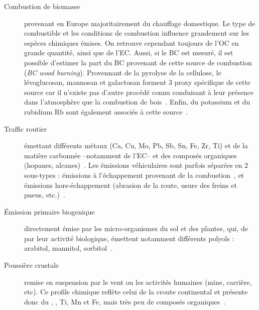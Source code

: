 \begin{description}
    \item[Combustion de biomasse] provenant en Europe majoritairement du chauffage
        domestique. Le type de combustible et les conditions de combustion influence
        grandement sur les espèces chimiques émises. On retrouve cependant toujours de
        l'OC en grande quantité, ainsi que de l'EC. Aussi, si le BC est mesuré, il est
        possible d'estimer la part du BC provenant de cette source de combustion \BCwb{}
        (\textit{BC wood burning}).
        Provennant de la pyrolyse de la cellulose, le lévoglucosan, mannosan et
        galactosan forment 3 proxy spécifique de cette source car il n'existe pas d'autre
        procédé connu conduisant à leur présence dans l'atmosphère que la combustion de
        bois~\autocite{jordanLevoglucosan2006,puxbaumLevoglucosan2007}.
        Enfin, du potassium  et du rubidium Rb sont également associés à cette
        source~\autocite{navaBiomass2015,gollyEtude2014,chevrierChauffage2016}.

    \item[Traffic routier] émettant différents métaux (Ca, Cu, Mo, Pb, Sb, Sn, Fe, Zr,
        Ti) et de la matière carbonnée --notamment de l'EC-- et des composés organiques
        (hopanes, alcanes)~\autocite{charronIdentification2019}. Les émissions
        véhiculaires sont parfois séparées en 2 sous-types : émissions à l'échappement
        provenant de la combustion~\autocite{allenSize2001,huMetals2009,vianaSource2008},
        et émissions hors-échappement (abrasion de la route, usure des freins et pneus,
        etc.)~\autocite{sandersAirborne2003,sternbeckMetal2002}.

    \item[Émission primaire biogenique] directement émise par les micro-organismes du sol
        et des plantes, qui, de par leur activité biologique, émettent notamment
        différents polyols : arabitol, mannitol,
        sorbitol~\autocite{bauerSignificant2008,yttriAmbient2007,samakePolyols2019}.

    \item[Poussière crustale] remise en suspension par le vent ou les activités humaines
        (mine, carrière, etc). Ce profile chimique reflète celui de la croute continental
        et présente donc du , , Ti, Mn et Fe, mais très peu de composés
        organiques~\autocite{almeidaSource2005,dallostoHourly2013,morenoVariations2011,putaudSizesegregated2004}.


\end{description}
